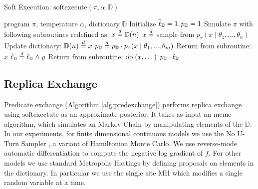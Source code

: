 \begin{algorithm}[tb]
  \caption{Soft Execution: $\textrm{softexecute}(\pi, \alpha, \mathbb{D})$}
  \label{alg:softexecute}
\begin{algorithmic}
 program $\pi$, temperature $\alpha$, dictionary $\mathbb{D}$
\STATE Initialize $\tilde{\operatorname{\ell}}_\mathbb{D} = 1, p_\mathbb{D} = 1$
\STATE Simulate $\pi$ with following subroutines redefined as:   
   \STATE $x \stackrel {d}{=} \mathbb{D}(n)$
 \ELSE
   \STATE $x \stackrel {d}{=} $ sample from $p_\tau(x \mid \theta_1, ..., \theta_n)$
   \STATE Update dictionary: $\mathbb{D}(n) \stackrel {d}{=} x$
 \ENDIF
 \STATE $p_\mathbb{D} \stackrel {d}{=} p_\mathbb{D} \cdot p_\tau(x \mid \theta_1, ..., \theta_m)$
 \STATE Return from subroutine: $x$
\ENDALOOP
\STATE
{}
  \STATE $\tilde{\operatorname{\ell}}_\mathbb{D} \stackrel {d}{=} \tilde{\operatorname{\ell}}_\mathbb{D} \mathrel{\tilde{\land}} y$
\ENDALOOP
\STATE
{}
  \STATE Return from subroutine: $\mathrel{\tilde{\textrm{op}}}(x, \dots)$ 
\ENDALOOP
\STATE
{} $p_\mathbb{D} \cdot \tilde{\operatorname{\ell}}_\mathbb{D}$
\end{algorithmic}
\end{algorithm}

\subsection{Replica Exchange}

Predicate exchange (Algorithm \ref{alg:predexchange}) performs replica exchange using $\textrm{softexectute}$ as an approximate posterior.
It takes as input an mcmc algorithm, which simulates an Markov Chain by manipulating elements of the $\mathbb{D}$.
In our experiments, for finite dimensional continuous models we use the No U-Turn Sampler \cite{hoffman2014no}, a variant of Hamiltonion Monte Carlo.
We use reverse-mode automatic differentiation \cite{griewank2008evaluating} to compute the negative log gradient of $f$.
For other models we use standard Metropolis Hastings by defining proposals on elements in the dictionary.
In particular we use the single site MH \cite{wingate2011lightweight} which modifies a single random variable at a time.


